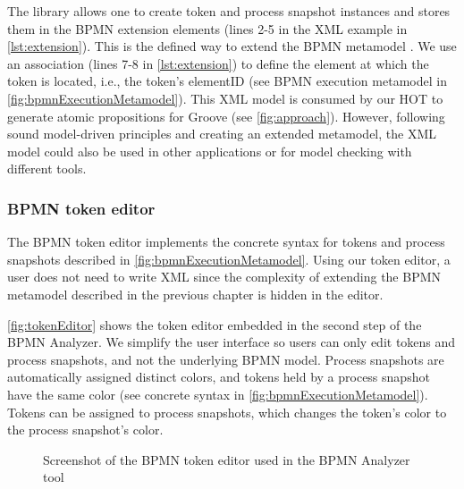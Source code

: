 \documentclass{lmcs} %
\begin{document}
The library allows one to create token and process snapshot instances and stores them in the BPMN extension elements (lines 2-5 in the XML example in \autoref{lst:extension}).
This is the defined way to extend the BPMN metamodel \cite{objectmanagementgroupBusinessProcessModel2013}.
We use an association (lines 7-8 in \autoref{lst:extension}) to define the element at which the token is located, i.e., the token's \textsf{elementID} (see BPMN execution metamodel in \autoref{fig:bpmnExecutionMetamodel}).
This XML model is consumed by our HOT to generate atomic propositions for Groove (see \autoref{fig:approach}).
However, following sound model-driven principles and creating an extended metamodel, the XML model could also be used in other applications or for model checking with different tools.

\subsubsection{BPMN token editor}
The BPMN token editor implements the concrete syntax for tokens and process snapshots described in \autoref{fig:bpmnExecutionMetamodel}.
Using our token editor, a user does not need to write XML since the complexity of extending the BPMN metamodel described in the previous chapter is hidden in the editor.

\autoref{fig:tokenEditor} shows the token editor embedded in the second step of the BPMN Analyzer.
We simplify the user interface so users can only edit tokens and process snapshots, and not the underlying BPMN model.
Process snapshots are automatically assigned distinct colors, and tokens held by a process snapshot have the same color (see concrete syntax in \autoref{fig:bpmnExecutionMetamodel}).
Tokens can be assigned to process snapshots, which changes the token's color to the process snapshot's color.

\begin{figure}[ht]
    \centering
    \caption{Screenshot of the BPMN token editor used in the BPMN Analyzer tool}
    \label{fig:tokenEditor}
\end{figure}
\end{document}
